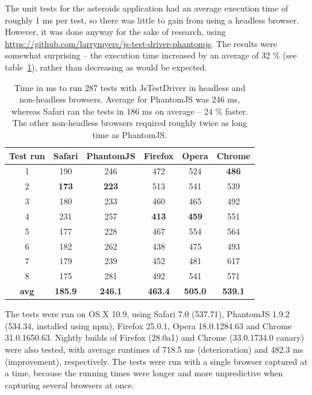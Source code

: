 \documentclass[11pt]{article}
\begin{document}
The unit tests for the asteroids application had an average execution time of roughly 1 ms per test, so there was little to gain from using a headless browser. However, it was done anyway for the sake of research, using \url{https://github.com/larrymyers/js-test-driver-phantomjs}. The results were somewhat surprising -- the execution time increased by an average of 32 \% (see table~\ref{tab:testruns}), rather than decreasing as would be expected.

\begin{table}
  \centering
    \begin{tabular}{ c | c c c c c}
    Test run & Safari  &  PhantomJS  &  Firefox  &  Opera  &  Chrome \\ \hline
     1           &  190    &        246         &    472    &     524    &    \textbf{486}   \\
     2           &  \textbf{173}    &        \textbf{223}         &    513    &     541    &    539   \\
     3           &  180    &        233         &    460    &     465    &    492   \\
     4           &  231    &        257         &    \textbf{413}    &     \textbf{459}    &    551   \\
     5           &  177    &        228         &    467    &     554    &    564   \\
     6           &  182    &        262         &    438    &     475    &    493   \\
     7           &  179    &        239         &    452    &     481    &    617   \\
     8           &  175    &        281         &    492    &     541    &    571   \\
     \textbf{avg}  &  \textbf{185.9}  &    \textbf{246.1}    &    \textbf{463.4}  &   \textbf{505.0} &   \textbf{539.1} \\
    \end{tabular}
  \caption{Time in ms to run 287 tests with JsTestDriver in headless and non-headless browsers. Average for PhantomJS was 246 ms, whereas Safari ran the tests in 186 ms on average -- 24 \% faster. The other non-headless browsers required roughly twice as long time as PhantomJS.}
  \label{tab:testruns}
\end{table}

The tests were run on OS X 10.9, using Safari 7.0 (537.71), PhantomJS 1.9.2 (534.34, installed using npm), Firefox 25.0.1, Opera 18.0.1284.63 and Chrome 31.0.1650.63. Nightly builds of Firefox (28.0a1) and Chrome (33.0.1734.0 canary) were also tested, with average runtimes of 718.5 ms (deterioration) and 482.3 ms (improvement), respectively. The tests were run with a single browser captured at a time, because the running times were longer and more unpredictive when capturing several browsers at once.
\end{document}
